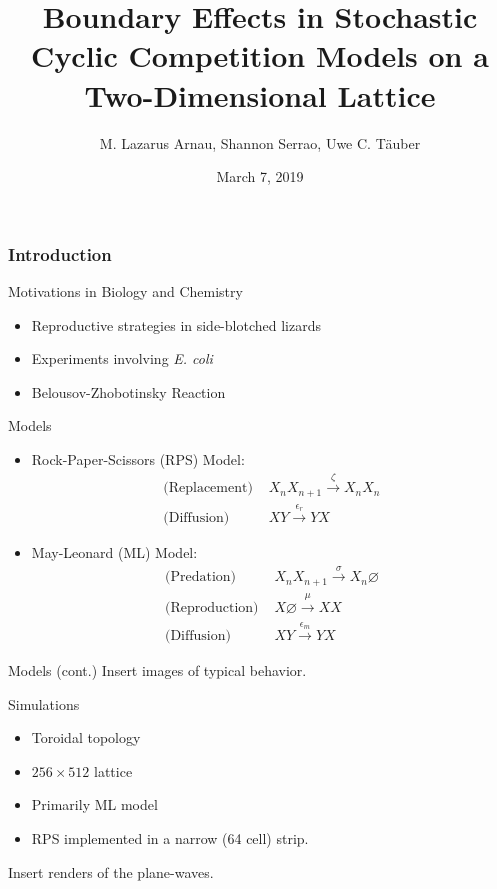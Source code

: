 \documentclass{beamer}
\title{\large Boundary Effects in Stochastic Cyclic Competition Models on a Two-Dimensional Lattice}
\author{M. Lazarus Arnau, Shannon Serrao, Uwe C. T\"auber}
\institute
{
    Department of Physics,\\
    Virginia Polytechnic Institute and State University
}
\date{March 7, 2019}
\begin{document}
    \frame{\titlepage}

    \begin{frame}
        \frametitle{Introduction}
        Motivations in Biology and Chemistry
        \begin{itemize}
            \item Reproductive strategies in side-blotched lizards\\
            \item Experiments involving \textit{E. coli}\\
            \item Belousov-Zhobotinsky Reaction
        \end{itemize}
    \end{frame}

    \begin{frame}[t]{Models}
        \begin{itemize}
            \item Rock-Paper-Scissors (RPS) Model:
                \begin{align*}
                    \text{(Replacement) } & X_nX_{n+1} \xrightarrow{\zeta} X_nX_n\\
                    \text{(Diffusion) } & XY \xrightarrow{\epsilon_r} YX
                \end{align*}
            \item May-Leonard (ML) Model:
                \begin{align*}
                    \text{(Predation) } & X_nX_{n+1} \xrightarrow{\sigma} X_n\varnothing\\
                    \text{(Reproduction) } & X\varnothing \xrightarrow{\mu} XX\\
                    \text{(Diffusion) } & XY \xrightarrow{\epsilon_m} YX
                \end{align*}
        \end{itemize} 
    \end{frame}

    \begin{frame}[t]{Models (cont.) }
        Insert images of typical behavior.
    \end{frame}

    \begin{frame}[t]{Simulations}
        \begin{itemize}
            \item Toroidal topology\\
            \item $ 256 \times 512 $ lattice\\
            \item Primarily ML model\\
            \item RPS implemented in a narrow (64 cell) strip.\\
        \end{itemize}
        Insert renders of the plane-waves.
    \end{frame}
\end{document}
